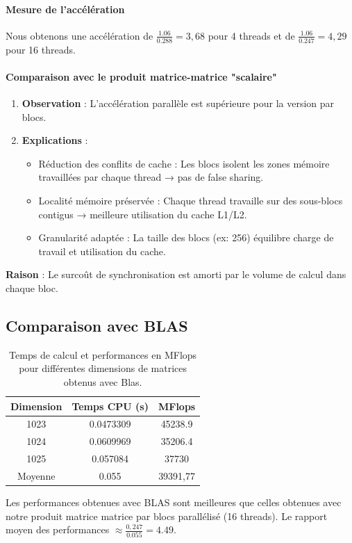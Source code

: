 \documentclass[a4paper,13pt]{book}
\begin{document}
\paragraph{Mesure de l'accélération}
 Nous obtenons une accélération de \textbf{$\frac{1.06}{0.288}=3,68$} pour 4 threads et de \textbf{$\frac{1.06}{0.247}=4,29$} pour 16 threads.
\paragraph{Comparaison avec le produit matrice-matrice "scalaire"}
\begin{enumerate}
\item \textbf{ Observation} :
L'accélération parallèle est supérieure pour la version par blocs.
\item \textbf{Explications }:
    \begin{itemize}
    \item Réduction des conflits de cache : Les blocs isolent les zones mémoire travaillées par chaque thread → pas de false sharing.
    \item Localité mémoire préservée : Chaque thread travaille sur des sous-blocs contigus → meilleure utilisation du cache L1/L2.
    \item Granularité adaptée : La taille des blocs (ex: 256) équilibre charge de travail et utilisation du cache.
    \end{itemize}
\end{enumerate}
\textbf{Raison }:
Le surcoût de synchronisation est amorti par le volume de calcul dans chaque bloc.
 \subsection{Comparaison avec BLAS} 

 \begin{table}[h!]
    \begin{center}
    \begin{tabular}{|c|c|c|}
        \hline
        Dimension & Temps CPU (s) & MFlops \\ \hline
        1023      & 0.0473309       & 45238.9 \\ \hline
        1024      & 0.0609969       & 35206.4 \\ \hline
        1025      & 0.057084       & 37730 \\ \hline
        Moyenne & 0.055 & 39391,77 \\ \hline
    \end{tabular}
    \caption{Temps de calcul et performances en MFlops pour différentes dimensions de matrices obtenus avec Blas.}
    \label{tab:perf_matrix}
\end{center}
\end{table}
Les performances obtenues avec BLAS sont meilleures que celles obtenues avec notre produit matrice matrice par blocs parallélisé (16 threads). Le rapport moyen des performances $\approx \frac{0,247}{0.055} = 4.49$.
\end{document}
